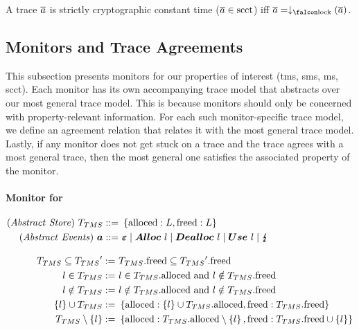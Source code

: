 \documentclass[acmsmall,review,screen,dvipsnames]{acmart}
\begin{document}
\begin{definition}
  A trace $\overline{a}$ is strictly cryptographic constant time ($\overline{a}\in\operatorname{scct}$) iff $\trace=\downarrow_{\lock}\left(\trace\right)$.
\end{definition}

\subsection{Monitors and Trace Agreements}\label{subsec:monitors}

This subsection presents monitors for our properties of interest (\gls{tms}, \gls{sms}, \gls{ms}, \gls{scct}).
Each monitor has its own accompanying trace model that abstracts over our most general trace model.
This is because monitors should only be concerned with property-relevant information.
For each such monitor-specific trace model, we define an agreement relation that relates it with the most general trace model.
Lastly, if any monitor does not get stuck on a trace and the trace agrees with a most general trace, then the most general one satisfies the associated property of the monitor.

\paragraph{Monitor for }
\begin{gather*}
  \begin{aligned}
    \mi{(Abstract\ Store)}~\tmsmonitor\bnfdef&\ \left\{\text{alloced}:L,\text{freed}:L\right\}\\
    \mi{(Abstract\ Events)}~\absevent\bnfdef&\ \absev{\emptyevent} \mid \absev{Alloc\ }\loc \mid \absev{Dealloc\ }\loc \mid \absev{Use\ }\loc \mid \absterm\\[0.33cm]
    \tmsmonitor\subseteq\tmsmonitor[']:=\ &\tmsmonitor.\text{freed}\subseteq\tmsmonitor['].\text{freed} \\
    \loc\in\tmsmonitor:=\ &\loc\in\tmsmonitor.\text{alloced}\text{ and }\loc\notin\tmsmonitor.\text{freed} \\
    \loc\notin\tmsmonitor:=\ &\loc\notin\tmsmonitor.\text{alloced}\text{ and }\loc\notin\tmsmonitor.\text{freed} \\
    \left\{\loc\right\}\cup\tmsmonitor:=\ & \left\{\text{alloced}:\left\{\loc\right\}\cup\tmsmonitor.\text{alloced},\text{freed}:\tmsmonitor.\text{freed}\right\}\\
    \tmsmonitor\setminus\left\{\loc\right\}:=\ &\left\{\text{alloced}:\tmsmonitor.\text{alloced}\setminus\left\{\loc\right\}, \text{freed}:\tmsmonitor.\text{freed}\cup\left\{\loc\right\}\right\}\\
  \end{aligned}
\end{gather*}
\end{document}
